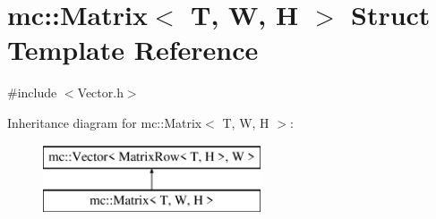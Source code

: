 \hypertarget{structmc_1_1_matrix}{}\section{mc\+:\+:Matrix$<$ T, W, H $>$ Struct Template Reference}
\label{structmc_1_1_matrix}


{\ttfamily \#include $<$Vector.\+h$>$}

Inheritance diagram for mc\+:\+:Matrix$<$ T, W, H $>$\+:\begin{figure}[H]
\begin{center}
\leavevmode
\includegraphics[height=2.000000cm]{structmc_1_1_matrix}
\end{center}
\end{figure}
